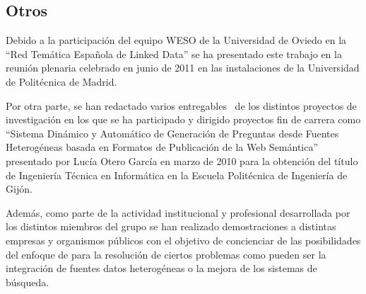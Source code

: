 \subsection{Otros}
Debido a la participación del equipo \gls{WESO} de la Universidad de Oviedo en la ``Red Temática Española
de Linked Data'' se ha presentado este trabajo en la reunión plenaria celebrado en junio de 2011 en las
instalaciones de la Universidad de Politécnica de Madrid. 

Por otra parte, se han redactado varios entregables~\cite{web-personal} de los distintos proyectos de investigación
en los que se ha participado y dirigido proyectos fin de carrera como ``Sistema Dinámico y Automático de Generación de Preguntas desde Fuentes Heterogéneas basada en Formatos de Publicación de la Web Semántica''
presentado por Lucía Otero García en marzo de 2010 para la obtención del título de Ingeniería Técnica en Informática
en la Escuela Politécnica de Ingeniería de Gijón.

Además, como parte de la actividad institucional y profesional desarrollada por los distintos miembros del grupo
se han realizado demostraciones a distintas empresas y organismos públicos con el objetivo de concienciar
de las posibilidades del enfoque de \linkeddata para la resolución de ciertos problemas como pueden ser
la integración de fuentes datos heterogéneas o la mejora de los sistemas de búsqueda.
